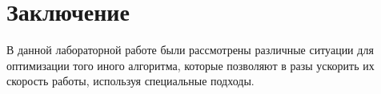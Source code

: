 \chapter*{Заключение}

В данной лабораторной работе были рассмотрены различные ситуации для оптимизации того иного алгоритма, которые позволяют в разы ускорить их скорость работы, используя специальные подходы.
